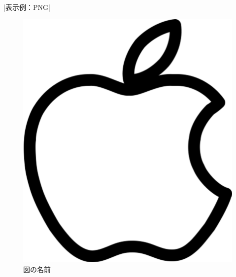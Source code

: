     |表示例：PNG|
    \begin{figure}[!h]
    \begin{screen}
    \begin{center}
        \includegraphics[scale=0.4, clip]{./img/apple.png}
        \caption{図の名前}
        \label{fig:図の名前}
    \end{center}
    \end{screen}
    \end{figure}

